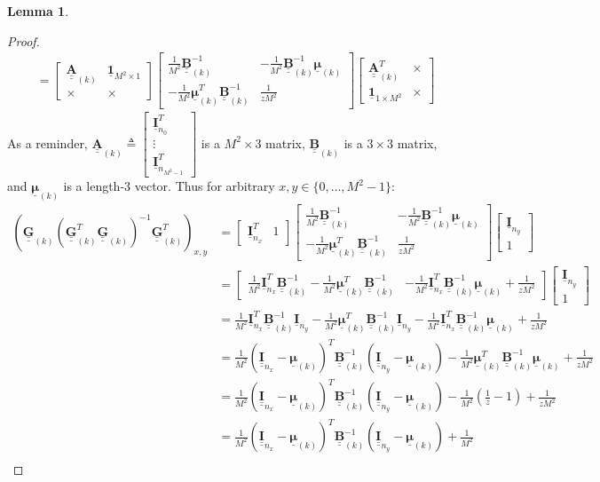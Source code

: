 \documentclass{article}
\newcommand{\bmat}[1]{\begin{bmatrix}#1\end{bmatrix}}
\theoremstyle{definition}
\newtheorem{lemma}[theorem]{Lemma}
\def\vt#1{\underline{\mathbf{#1}}}
\def\vts#1{\underline{\boldsymbol{#1}}}
\def\mt#1{\underline{\underline{\mathbf{#1}}}}
\begin{document}
\begin{lemma}
\begin{proof}
\begin{align*}
            &= \bmat{\mt A_{(k)} & \vt 1_{M^2\times 1} \\ \times & \times}
            \bmat{
                \frac1{M^2} \mt B_{(k)}^{-1}  & -\frac1{M^2} \mt B_{(k)}^{-1}\vts\mu_{(k)} \\
                -\frac1{M^2}\vts\mu_{(k)}^T \mt B_{(k)}^{-1}   & \frac1{zM^2}
            }
            \bmat{\mt A_{(k)}^T & \times \\ \vt 1_{1\times M^2} & \times}
        \end{align*}
        As a reminder, $\mt A_{(k)} \triangleq \left[ \begin{smallmatrix} \vt I_{n_0}^T \\ \vdots \\ \vt I_{n_{M^2-1}}^T \end{smallmatrix} \right]$ is a $M^2\times 3$ matrix, $\mt B_{(k)}$ is a $3 \times 3$ matrix, and $\vts \mu_{(k)}$ is a length-$3$ vector. Thus for arbitrary $x,y\in\{0,\dots,M^2-1\}$:
        \begin{align*}
            \left(\mt G_{(k)} \left(\mt G_{(k)}^T \mt G_{(k)}\right)^{-1} \mt G_{(k)}^T\right)_{x,y}
            &= \bmat{\vt I_{n_x}^T & 1} \bmat{
                \frac1{M^2} \mt B_{(k)}^{-1}  & -\frac1{M^2} \mt B_{(k)}^{-1}\vts\mu_{(k)} \\
                -\frac1{M^2}\vts\mu_{(k)}^T \mt B_{(k)}^{-1}   & \frac1{zM^2}
            } \bmat{\vt I_{n_y} \\ 1}\\
            &= \bmat{
                \frac1{M^2}\vt I_{n_x}^T \mt B_{(k)}^{-1}-\frac1{M^2}\vts\mu_{(k)}^T \mt B_{(k)}^{-1}   & -\frac1{M^2} \vt I_{n_x}^T\mt B_{(k)}^{-1}\vts\mu_{(k)} + \frac1{zM^2}
            } \bmat{\vt I_{n_y} \\ 1}\\
            &= \frac1{M^2}\vt I_{n_x}^T \mt B_{(k)}^{-1}\vt I_{n_y} - \frac1{M^2}\vts\mu_{(k)}^T \mt B_{(k)}^{-1}\vt I_{n_y} -\frac1{M^2} \vt I_{n_x}^T\mt B_{(k)}^{-1}\vts\mu_{(k)} + \frac1{zM^2}\\
            &= \frac1{M^2}\left(\mt I_{n_x} - \vts \mu_{(k)}\right)^T \mt B_{(k)}^{-1} \left(\mt I_{n_y} - \vts \mu_{(k)}\right) - \frac1{M^2}\vts \mu_{(k)}^T\mt B_{(k)}^{-1} \vts \mu_{(k)} + \frac1{zM^2}\\
            &= \frac1{M^2}\left(\mt I_{n_x} - \vts \mu_{(k)}\right)^T \mt B_{(k)}^{-1} \left(\mt I_{n_y} - \vts \mu_{(k)}\right) - \frac1{M^2}\left(\frac1z-1\right) + \frac1{zM^2}\\
            &= \frac1{M^2}\left(\mt I_{n_x} - \vts \mu_{(k)}\right)^T \mt B_{(k)}^{-1} \left(\mt I_{n_y} - \vts \mu_{(k)}\right) + \frac1{M^2}\\

\end{align*}
\end{proof}
\end{lemma}
\end{document}
